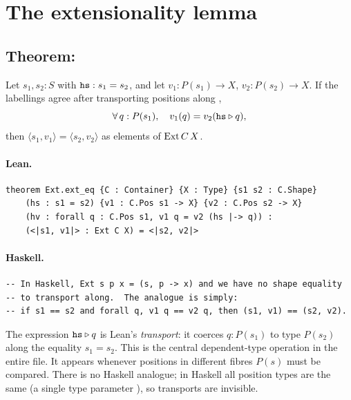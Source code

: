\documentclass[11pt,a4paper]{article}
\begin{document}
\section{The extensionality lemma}

\subsection{Theorem: }

\begin{thm}
Let $s_1, s_2 : S$ with $\texttt{hs} : s_1 = s_2$, and let
$v_1 : P(s_1) \to X$, $v_2 : P(s_2) \to X$.  If the labellings agree after
transporting positions along ,
\[
  \forall\, q : P(s_1),\quad v_1(q) = v_2(\texttt{hs} \triangleright q),
\]
then $\langle s_1, v_1 \rangle = \langle s_2, v_2 \rangle$ as elements of
$\mathrm{Ext}\,C\,X$.
\end{thm}

\paragraph{Lean.}
\begin{lstlisting}[style=lean]
theorem Ext.ext_eq {C : Container} {X : Type} {s1 s2 : C.Shape}
    (hs : s1 = s2) {v1 : C.Pos s1 -> X} {v2 : C.Pos s2 -> X}
    (hv : forall q : C.Pos s1, v1 q = v2 (hs |-> q)) :
    (<|s1, v1|> : Ext C X) = <|s2, v2|>
\end{lstlisting}

\paragraph{Haskell.}
\begin{lstlisting}[style=haskell]
-- In Haskell, Ext s p x = (s, p -> x) and we have no shape equality
-- to transport along.  The analogue is simply:
-- if s1 == s2 and forall q, v1 q == v2 q, then (s1, v1) == (s2, v2).
\end{lstlisting}

\begin{fidelitynote}
The expression $\texttt{hs} \triangleright q$ is Lean's \emph{transport}: it
coerces $q : P(s_1)$ to type $P(s_2)$ along the equality $s_1 = s_2$.  This
is the central dependent-type operation in the entire file.  It appears
whenever positions in different fibres $P(s)$ must be compared.  There is no
Haskell analogue; in Haskell all position types are the same (a single type
parameter ), so transports are invisible.
\end{fidelitynote}
\end{document}
